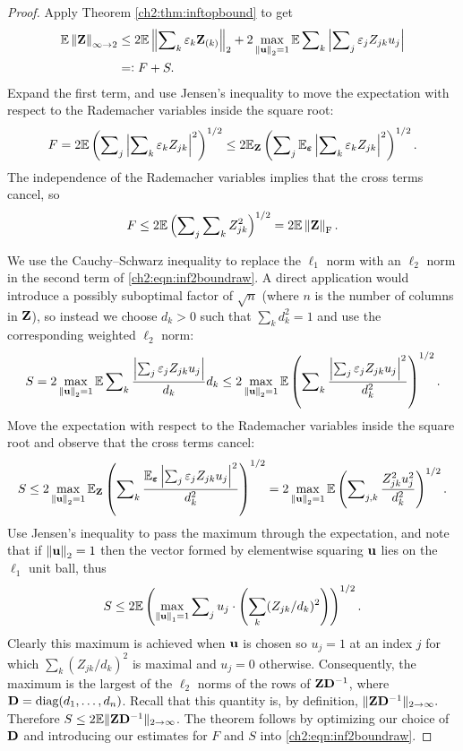 \begin{proof}
Apply Theorem \ref{ch2:thm:inftopbound} to get 
\begin{equation}
\begin{aligned}
\mathbb{E}\left\|\mathbf{Z}\right\|_{\infty\rightarrow2} &
\leq2\mathbb{E}\left\|\sum\nolimits_{k}\varepsilon_{k}\mathbf{Z}_{(k)}\right\|_{2}
+2\max_{\left\|\mathbf{u}\right\|_2 = 1}\mathbb{E}\sum\nolimits_{k}\left|\sum\nolimits_{j}\varepsilon_{j}Z_{jk}u_
{j}\right| \\
	& =\mathrel{\mathop:} F + S.
\end{aligned}
\label{ch2:eqn:inf2boundraw}
\end{equation}
Expand the first term, and use Jensen's inequality to move the expectation with
respect to the Rademacher variables inside the square root: 
\[
F =
2\mathbb{E}\left(\sum\nolimits_{j}\left|\sum\nolimits_{k}\varepsilon_{k}Z_{jk}\right|^{2
}\right)^{1/2}\leq2\mathbb{E}_{\mathbf{Z}}\left(\sum\nolimits_{j}\mathbb{E}_{\boldsymbol{
\varepsilon}}\left|\sum\nolimits_{k}\varepsilon_{k}Z_{jk}\right|^{2}\right)^{1/2
}.
\]
The independence of the Rademacher variables implies that the cross terms
cancel, so 
\[
F
\leq2\mathbb{E}\left(\sum\nolimits_{j}\sum\nolimits_{k}Z_{jk}^{2}\right)^{1/2}=2\mathbb{E}\left\|\mathbf{Z}\right\|_{\mathrm{F}}.
\]

We use the Cauchy--Schwarz inequality to replace the $\ell_{1}$ norm with an
$\ell_{2}$ norm in the second term of \eqref{ch2:eqn:inf2boundraw}. A direct
application would introduce a possibly suboptimal factor of $\sqrt{n}$ (where
$n$ is the number of columns in $\mathbf{Z}$), so instead we choose $d_{k}>0$ such
that $\sum_{k}d_{k}^{2}=1$ and use the corresponding weighted $\ell_{2}$ norm: 
\[
S =
2\max_{\left\|\mathbf{u}\right\|_2 = 1}\mathbb{E}\sum\nolimits_{k}\frac{\left|\sum\nolimits_{j}\varepsilon_{j}Z_{
jk}u_{j}\right|}{d_{k}}d_{k}\leq2\max_{\left\|\mathbf{u}\right\|_2 = 1}\mathbb{E}\left(\sum\nolimits_{k}\frac{
\left|\sum\nolimits_{j}\varepsilon_{j}Z_{jk}u_{j}\right|^{2}}{d_{k}^{2}}\right)^
{1/2}.
\]
Move the expectation with respect to the Rademacher variables inside the square
root and observe that the cross terms cancel:
\[
S\leq2\max_{\left\|\mathbf{u}\right\|_2 = 1}\mathbb{E}_{\mathbf{Z}}\left(\sum\nolimits_{k}\frac{\mathbb{E}_{\boldsymbol{
\varepsilon}}\left|\sum\nolimits_{j}\varepsilon_{j}Z_{jk}u_{j}\right|^{2}}{d_{k}
^{2}}\right)^{1/2}=2\max_{\left\|\mathbf{u}\right\|_2 = 1}\mathbb{E}\left(\sum\nolimits_{j,k}\frac{Z_{jk}^{2}u_{j
}^{2}}{d_{k}^{2}}\right)^{1/2}.
\]
Use Jensen's inequality to pass the maximum through the expectation, and note
that if $\left\|\mathbf{u}\right\|_{2}=1$ then the vector formed by elementwise squaring
$\mathbf{u}$ lies on the $\ell_{1}$ unit ball, thus 
\[
S
\leq2\mathbb{E}\left(\max_{\left\|\mathbf{u}\right\|_{1}=1}\sum\nolimits_j 
  u_j \cdot \left(\sum_k (Z_{jk}/d_{k})^2 \right)\right)^{1/2}.
\]
Clearly this maximum is achieved when $\mathbf{u}$ is chosen so $u_{j}=1$ at an
index $j$ for which
$\sum\nolimits_{k}(Z_{jk}/d_{k})^2$ is
maximal and $u_{j}=0$ otherwise. Consequently, the maximum is the largest of the
$\ell_{2}$ norms of the rows of $\mathbf{Z}\mathbf{D}^{-1}$, where
$\mathbf{D}=\text{diag}(d_{1},\ldots,d_{n})$. Recall that this quantity is, by
definition, $\|\mathbf{Z}\mathbf{D}^{-1}\|_{2 \rightarrow \infty}.$ Therefore $S
\leq2\mathbb{E}\|\mathbf{Z}\mathbf{D}^{-1}\|_{2 \rightarrow \infty}$. The theorem follows by optimizing our
choice of $\mathbf{D}$ and introducing our estimates for $F$ and $S$ into
\eqref{ch2:eqn:inf2boundraw}. 
\end{proof}

